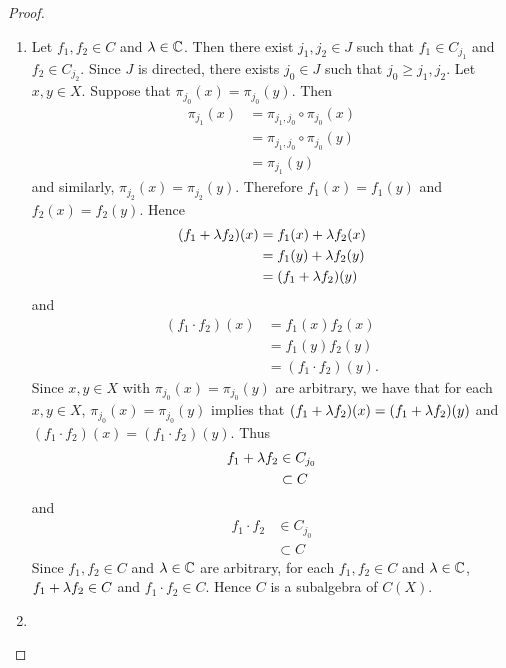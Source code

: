\documentclass{book}
\begin{document}
	\begin{proof}\
		\begin{enumerate}
			\item Let $f_1 , f_2 \in C$ and $\lambda \in \mathbb{C}$. Then there exist $j_1, j_2 \in J$ such that $f_1 \in C_{j_1}$ and $f_2 \in C_{j_2}$. Since $J$ is directed, there exists $j_0 \in J$ such that $j_0 \geq j_1, j_2$. Let $x,y \in X$. Suppose that $\pi_{j_0}(x) = \pi_{j_0}(y)$. Then 
			\begin{align*}
				\pi_{j_1}(x)
				& = \pi_{j_1, j_0} \circ \pi_{j_0}(x) \\
				& =  \pi_{j_1, j_0} \circ \pi_{j_0}(y) \\
				& = \pi_{j_1}(y)
			\end{align*}
			and similarly, $\pi_{j_2}(x) = \pi_{j_2}(y)$. Therefore $f_1(x) = f_1(y)$ and $f_{2}(x) = f_2(y)$. Hence 
			\begin{align*}
				(f_1 + \lambda f_2)(x)
				& = f_1(x) + \lambda f_2(x) \\
				& = f_1(y) + \lambda f_2(y) \\
				& = (f_1 + \lambda f_2)(y)
			\end{align*}
			and 
			\begin{align*}
				(f_1 \cdot f_2)(x)
				& = f_1(x)f_2(x) \\
				& = f_1(y)f_2(y) \\
				& = (f_1 \cdot f_2) (y).
			\end{align*}
			Since $x, y \in X$ with $\pi_{j_0}(x) = \pi_{j_0}(y)$ are arbitrary, we have that for each $x,y \in X$, $\pi_{j_0}(x) = \pi_{j_0}(y)$ implies that $(f_1 + \lambda f_2)(x) = (f_1 + \lambda f_2)(y)$ and $(f_1 \cdot f_2)(x) = (f_1 \cdot f_2)(y)$. Thus 
			\begin{align*}
				f_1 + \lambda f_2 
				& \in C_{j_0} \\
				& \subset C
			\end{align*} 
			and 
			\begin{align*}
				f_1 \cdot f_2
				& \in C_{j_0} \\
				& \subset C
			\end{align*} 
			Since $f_1 , f_2 \in C$ and $\lambda \in \mathbb{C}$ are arbitrary, for each $f_1 , f_2 \in C$ and $\lambda \in \mathbb{C}$, $f_1 + \lambda f_2 \in C$ and $f_1 \cdot f_2 \in C$. Hence $C$ is a subalgebra of $C(X)$. 
			\item 
		\end{enumerate}
	\end{proof}
	
	
	
\end{document}
